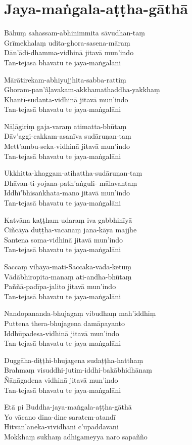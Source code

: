 \chapter{Jaya-maṅgala-aṭṭha-gāthā}%


\begin{paritta}
Bāhuṃ sahassam-abhinimmita sāvudhan-taṃ\\
Grīmekhalaṃ udita-ghora-sasena-māraṃ\\
Dān'ādi-dhamma-vidhinā jitavā mun'indo\\
Tan-tejasā bhavatu te jaya-maṅgalāni

Mārātirekam-abhiyujjhita-sabba-rattiṃ\\
Ghoram-pan'âḷavakam-akkhamathaddha-yakkhaṃ\\
Khantī-sudanta-vidhinā jitavā mun'indo\\
Tan-tejasā bhavatu te jaya-maṅgalāni

Nāḷāgiriṃ gaja-varaṃ atimatta-bhūtaṃ\\
Dāv'aggi-cakkam-asanīva sudāruṇan-taṃ\\
Mett'ambu-seka-vidhinā jitavā mun'indo\\
Tan-tejasā bhavatu te jaya-maṅgalāni

Ukkhitta-khaggam-atihattha-sudāruṇan-taṃ\\
Dhāvan-ti-yojana-path'aṅguli- mālavantaṃ\\
Iddhī'bhisaṅkhata-mano jitavā mun'indo\\
Tan-tejasā bhavatu te jaya-maṅgalāni

Katvāna kaṭṭham-udaraṃ iva gabbhinīyā\\
Ciñcāya duṭṭha-vacanaṃ jana-kāya majjhe\\
Santena soma-vidhinā jitavā mun'indo\\
Tan-tejasā bhavatu te jaya-maṅgalāni

Saccaṃ vihāya-mati-Saccaka-vāda-ketuṃ\\
Vādābhiropita-manaṃ ati-andha-bhūtaṃ\\
Paññā-padīpa-jalito jitavā mun'indo\\
Tan-tejasā bhavatu te jaya-maṅgalāni

Nandopananda-bhujagaṃ vibudhaṃ mah'iddhiṃ\\
Puttena thera-bhujagena damāpayanto\\
Iddhūpadesa-vidhinā jitavā mun'indo\\
Tan-tejasā bhavatu te jaya-maṅgalāni

Duggāha-diṭṭhi-bhujagena sudaṭṭha-hatthaṃ\\
Brahmaṃ visuddhi-jutim-iddhi-bakābhidhānaṃ\\
Ñāṇāgadena vidhinā jitavā mun'indo\\
Tan-tejasā bhavatu te jaya-maṅgalāni

Etā pi Buddha-jaya-maṅgala-aṭṭha-gāthā\\
Yo vācano dina-dine saratem-atandī\\
Hitvān'aneka-vividhāni c'upaddavāni\\
Mokkhaṃ sukhaṃ adhigameyya naro sapañño
\end{paritta}

